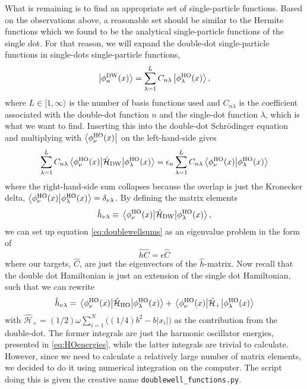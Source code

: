 What is remaining is to find an appropriate set of single-particle functions. Based on the observations above, a reasonable set should be similar to the Hermite functions which we found to be the analytical single-particle functions of the single dot. For that reason, we will expand the double-dot single-particle functions in single-dots single-particle functions,
\begin{equation}
\ket{\phi_n^{\text{DW}}(x)}=\sum_{\lambda=1}^{L}C_{n\lambda}\ket{\phi_{\lambda}^{\text{HO}}(x)},
\end{equation}
where $L\in[1,\infty\rangle$ is the number of basis functions used and $C_{n\lambda}$ is the coefficient associated with the double-dot function $n$ and the single-dot function $\lambda$, which is what we want to find. Inserting this into the double-dot Schrödinger equation and multiplying with $\bra{\phi_{\nu}^{\text{HO}}(x)}$ on the left-hand-side gives
\begin{equation}
\label{eq:doublewellsums}
\sum_{\lambda=1}^LC_{n\lambda}\mel{\phi_{\nu}^{\text{HO}}(x)}{\hat{\mathcal{H}}_{\text{DW}}}{\phi_{\lambda}^{\text{HO}}(x)}=\epsilon_n\sum_{\lambda=1}^LC_{n\lambda}\braket{\phi_{\nu}^{\text{HO}}(x)}{\phi_{\lambda}^{\text{HO}}(x)}
\end{equation}
where the right-hand-side sum collapses because the overlap is just the Kronecker delta, $\braket{\phi_{\nu}^{\text{HO}}(x)}{\phi_{\lambda}^{\text{HO}}(x)}=\delta_{\nu\lambda}$. By defining the matrix elements
\begin{equation}
\hat{h}_{\nu\lambda}\equiv\mel{\phi_{\nu}^{\text{HO}}(x)}{\hat{\mathcal{H}}_{\text{DW}}}{\phi_{\lambda}^{\text{HO}}(x)},
\end{equation}
we can set up equation \eqref{eq:doublewellsums} as an eigenvalue problem in the form of
\begin{equation}
\hat{h}\hat{C}=\epsilon\hat{C}
\end{equation}
where our targets, $\hat{C}$, are just the eigenvectors of the $\hat{h}$-matrix. Now recall that the double dot Hamiltonian is just an extension of the single dot Hamiltonian, such that we can rewrite
\begin{equation}
\hat{h}_{\nu\lambda}=\mel{\phi_{\nu}^{\text{HO}}(x)}{\hat{\mathcal{H}}_{\text{HO}}}{\phi_{\lambda}^{\text{HO}}(x)}+\mel{\phi_{\nu}^{\text{HO}}(x)}{\hat{\mathcal{H}}_{\text{+}}}{\phi_{\lambda}^{\text{HO}}(x)}
\end{equation}
with $\hat{\mathcal{H}}_{\text{+}}=(1/2)\omega\sum_{i=1}^N\Big((1/4)b^2-b|x_i|\Big)$ as the contribution from the double-dot. The former integrals are just the harmonic oscillator energies, presented in \eqref{eq:HOenergies}, while the latter integrals are trivial to calculate. However, since we need to calculate a relatively large number of matrix elements, we decided to do it using numerical integration on the computer. The script doing this is given the creative name \lstinline|doublewell_functions.py|.

